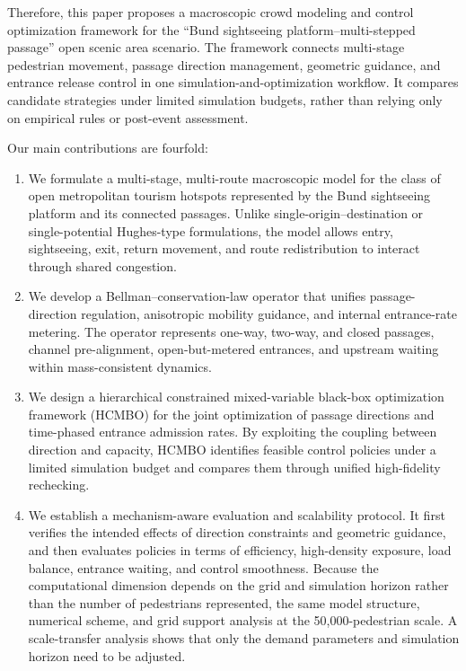 \documentclass[lettersize,journal]{IEEEtran}
\begin{document}
Therefore, this paper proposes a macroscopic crowd modeling and control optimization framework for the ``Bund sightseeing platform--multi-stepped passage'' open scenic area scenario.
The framework connects multi-stage pedestrian movement, passage direction management, geometric guidance, and entrance release control in one simulation-and-optimization workflow.
It compares candidate strategies under limited simulation budgets, rather than relying only on empirical rules or post-event assessment.

Our main contributions are fourfold:
\begin{enumerate}
\item We formulate a multi-stage, multi-route macroscopic model for the class of open metropolitan tourism hotspots represented by the Bund sightseeing platform and its connected passages. Unlike single-origin--destination or single-potential Hughes-type formulations, the model allows entry, sightseeing, exit, return movement, and route redistribution to interact through shared congestion.

\item We develop a Bellman--conservation-law operator that unifies passage-direction regulation, anisotropic mobility guidance, and internal entrance-rate metering. The operator represents one-way, two-way, and closed passages, channel pre-alignment, open-but-metered entrances, and upstream waiting within mass-consistent dynamics.

\item We design a hierarchical constrained mixed-variable black-box optimization framework (HCMBO) for the joint optimization of passage directions and time-phased entrance admission rates. By exploiting the coupling between direction and capacity, HCMBO identifies feasible control policies under a limited simulation budget and compares them through unified high-fidelity rechecking.

\item We establish a mechanism-aware evaluation and scalability protocol. It first verifies the intended effects of direction constraints and geometric guidance, and then evaluates policies in terms of efficiency, high-density exposure, load balance, entrance waiting, and control smoothness. Because the computational dimension depends on the grid and simulation horizon rather than the number of pedestrians represented, the same model structure, numerical scheme, and grid support analysis at the 50,000-pedestrian scale. A scale-transfer analysis shows that only the demand parameters and simulation horizon need to be adjusted.
\end{enumerate}
\end{document}

